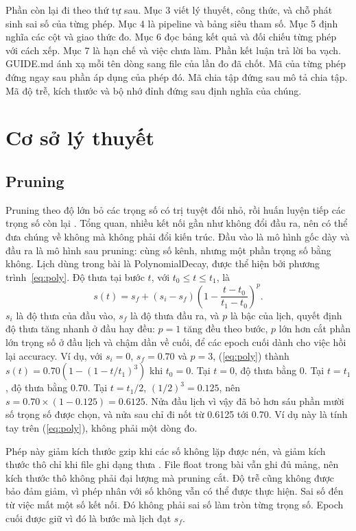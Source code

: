 \documentclass[13pt,a4paper]{article}
\begin{document}
Phần còn lại đi theo thứ tự sau.
Mục 3 viết lý thuyết, công thức, và chỗ phát sinh sai số của từng phép.
Mục 4 là pipeline và bảng siêu tham số.
Mục 5 định nghĩa các cột và giao thức đo.
Mục 6 đọc bảng kết quả và đối chiếu từng phép với cách xếp.
Mục 7 là hạn chế và việc chưa làm.
Phần kết luận trả lời ba vạch.
GUIDE.md ánh xạ mỗi tên dòng sang file của lần đo đã chốt.
Mã của từng phép đứng ngay sau phần áp dụng của phép đó.
Mã chia tập đứng sau mô tả chia tập.
Mã độ trễ, kích thước và bộ nhớ đỉnh đứng sau định nghĩa của chúng.

\section{Cơ sở lý thuyết}
\label{sec:theory}

\subsection{Pruning}

Pruning theo độ lớn bỏ các trọng số có trị tuyệt đối nhỏ, rồi huấn luyện tiếp các trọng số còn lại \cite{han2016}.
Tổng quan, nhiều kết nối gần như không đổi đầu ra, nên có thể đưa chúng về không mà không phải đổi kiến trúc.
Đầu vào là mô hình gốc dày và 
đầu ra là mô hình sau pruning: cùng số kênh, nhưng một phần trọng số bằng không.
Lịch dùng trong bài là PolynomialDecay, được thể hiện bởi phương trình~\eqref{eq:poly}.
Độ thưa tại bước \(t\), với \(t_0 \le t \le t_1\), là
\begin{equation}
s(t) = s_f + (s_i - s_f)\left(1 - \frac{t - t_0}{t_1 - t_0}\right)^{p}.
\label{eq:poly}
\end{equation}
\(s_i\) là độ thưa của đầu vào, \(s_f\) là độ thưa đầu ra, và \(p\) là bậc của lịch, quyết định độ thưa tăng nhanh ở đầu hay đều: \(p = 1\) tăng đều theo bước, \(p\) lớn hơn cắt phần lớn trọng số ở đầu lịch và chậm dần về cuối, để các epoch cuối dành cho việc hồi lại accuracy.
Ví dụ, với \(s_i = 0\), \(s_f = 0.70\) và \(p = 3\), (\ref{eq:poly}) thành \(s(t) = 0.70\left(1 - (1 - t/t_1)^{3}\right)\) khi \(t_0 = 0\).
Tại \(t = 0\), độ thưa bằng 0.
Tại \(t = t_1\), độ thưa bằng 0.70.
Tại \(t = t_1/2\), \((1/2)^{3} = 0.125\), nên \(s = 0.70\times(1 - 0.125) = 0.6125\).
Nửa đầu lịch vì vậy đã bỏ hơn sáu phần mười số trọng số được chọn, và nửa sau chỉ đi nốt từ 0.6125 tới 0.70.
Ví dụ này là tính tay trên (\ref{eq:poly}), không phải một dòng đo.

Phép này giảm kích thước gzip khi các số không lặp được nén, và giảm kích thước thô chỉ khi file ghi dạng thưa \cite{han2016}.
File float trong bài vẫn ghi đủ mảng, nên kích thước thô không phải đại lượng mà pruning cắt.
Độ trễ cũng không được bảo đảm giảm, vì phép nhân với số không vẫn có thể được thực hiện.
Sai số đến từ việc mất một số kết nối.
Đó không phải sai số làm tròn từng trọng số.
Epoch cuối được giữ vì đó là bước mà lịch đạt \(s_f\).
\end{document}
